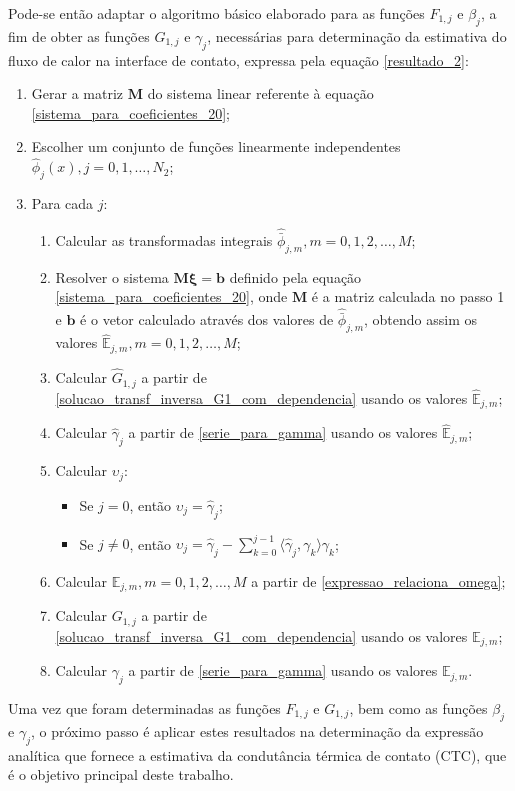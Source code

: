 Pode-se então adaptar o algoritmo básico elaborado para as funções $F_{1,j}$ e $\beta_j$, a fim de obter as funções $G_{1,j}$ e $\gamma_j$, necessárias para determinação da estimativa do fluxo de calor na interface de contato, expressa pela equação \eqref{resultado_2}:
\begin{enumerate}
	\item Gerar a matriz $\mathbf{M}$ do sistema linear referente à equação \eqref{sistema_para_coeficientes_20};
	\item Escolher um conjunto de funções linearmente independentes $\hat{\phi}_j(x), j=0,1,\ldots,N_2$;
	\item Para cada $j$:
	\begin{enumerate}	
		\item Calcular as transformadas integrais $\hat{\bar{\phi}}_{j,m}, m=0,1,2, \ldots, M$;
		\item Resolver o sistema $\mathbf{M}\mathbf{\xi} = \mathbf{b}$ definido pela equação \eqref{sistema_para_coeficientes_20}, onde $\mathbf{M}$ é a matriz calculada no passo 1 e $\mathbf{b}$ é o vetor calculado através dos valores de $\hat{\bar{\phi}}_{j,m}$, obtendo assim os valores $\hat{\mathbb{E}}_{j,m}, m=0,1,2, \ldots, M$;
		\item Calcular $\hat{G}_{1,j}$ a partir de \eqref{solucao_transf_inversa_G1_com_dependencia} usando os valores $\hat{\mathbb{E}}_{j,m}$;
		\item Calcular $\hat{\gamma}_j$ a partir de \eqref{serie_para_gamma} usando os valores $\hat{\mathbb{E}}_{j,m}$;
		\item Calcular $\upsilon_j$:
		\begin{itemize}
			\item Se $j = 0$, então $\upsilon_j = \hat{\gamma}_j$;
			\item Se $j \ne 0$, então $\upsilon_j = \hat{\gamma}_j - \displaystyle\sum_{k = 0}^{j - 1} \langle \hat{\gamma}_j, \gamma_k\rangle\gamma_k$;
		\end{itemize}
		\item Calcular $\mathbb{E}_{j,m}, m=0,1,2, \ldots, M$ a partir de \eqref{expressao_relaciona_omega};
		\item Calcular $G_{1,j}$ a partir de \eqref{solucao_transf_inversa_G1_com_dependencia} usando os valores $\mathbb{E}_{j,m}$;
		\item Calcular $\gamma_j$ a partir de \eqref{serie_para_gamma} usando os valores $\mathbb{E}_{j,m}$.
	\end{enumerate}
\end{enumerate}

Uma vez que foram determinadas as funções $F_{1,j}$ e $G_{1,j}$, bem como as funções $\beta_j$ e $\gamma_j$, o próximo passo é aplicar estes resultados na determinação da expressão analítica que fornece a estimativa da condutância térmica de contato (CTC), que é o objetivo principal deste trabalho.